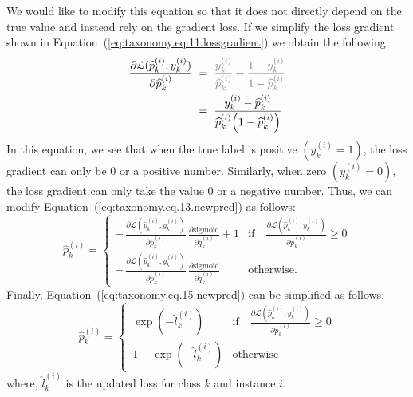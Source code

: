 We would like to modify this equation so that it does not directly depend on the true value and instead rely on the gradient loss. If we simplify the loss gradient shown in Equation~(\ref{eq:taxonomy.eq.11.lossgradient})  we obtain the following:
\begin{align}
    \label{eq:taxonomy.eq.14.newlossgradient}
    \frac{\partial \mathcal{L}(\widehat{p}_k^{(i)}, y_k^{(i)})}{\partial \widehat{p}_k^{(i)}}
    & \; = \; \textcolor{gray}{\frac{y_k^{(i)}}{\widehat{p}_k^{(i)}} - \frac{1 - y_k^{(i)}}{1 - \widehat{p}_k^{(i)}} }
    \\
    & \; = \; \frac{y_k^{(i)} - \widehat{p}_k^{(i)}}{\widehat{p}_k^{(i)}{\left(1 - \widehat{p}_k^{(i)}\right)}}
\end{align}
In this equation, we see that when the true label is positive $\left(y_k^{(i)}=1\right) $, the loss gradient can only be 0 or a positive number. Similarly, when zero $\left(y_k^{(i)}=0\right) $, the loss gradient can only take the value 0 or a negative number. Thus, we can modify Equation~(\ref{eq:taxonomy.eq.13.newpred})  as follows:
\begin{equation}
    \label{eq:taxonomy.eq.15.newpred}
    \widehat{p}_k^{(i)} =
    \begin{cases}
        -\, \frac{\partial \mathcal{L}(\widehat{p}_k^{(i)}, y_k^{(i)})}{\partial {\widehat p}_k^{(i)}} \, \frac{\partial{\text{sigmoid}}}{\partial{\widehat{q}_k^{(i)}}} + 1
        &
        \text{if} \quad \frac{\partial \mathcal{L}(\widehat{p}_k^{(i)}, y_k^{(i)})}{\partial {\widehat p}_k^{(i)}} \geq 0
        \\
        -\, \frac{\partial \mathcal{L}(\widehat{p}_k^{(i)}, y_k^{(i)})}{\partial {\widehat p}_k^{(i)}} \, \frac{\partial{\text{sigmoid}}}{\partial{\widehat{q}_k^{(i)}}}
        &
        \text{otherwise.}
    \end{cases}
\end{equation}
Finally, Equation~(\ref{eq:taxonomy.eq.15.newpred}) can be simplified as follows:
\begin{equation}
    \label{eq:taxonomy.eq.16.newpred}
    \widehat{p}_k^{(i)} =
    \begin{cases}
        \, \exp(-\widehat{l}_k^{(i)})
        &
        \text{if} \quad \frac{\partial \mathcal{L}(\widehat{p}_k^{(i)}, y_k^{(i)})}{\partial {\widehat p}_k^{(i)}} \geq 0
        \\
        \, 1 - \exp(-\widehat{l}_k^{(i)})
        &
        \text{otherwise}
    \end{cases}
\end{equation}
where, ${\widehat l}_k^{(i)} $ is the updated loss for class $k $ and instance $i $.

